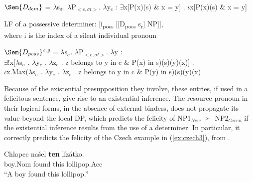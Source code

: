 \documentclass[output=paper,modfonts,nonflat]{langsci/langscibook}
\begin{document}
\ea
$\Sem{D_{dem}}$ = $\lambda$s$_{\sigma}$. $\lambda$P$_{<e,\sigma t>}$. $\lambda$y$_{e}$ : $\exists$x[P(x)(s) \& x = y] . $\iota$x[P(x)(s) \& x = y] \label{definition:demonstrative}
\z


\ea LF of a possessive determiner:
[i\textsubscript{poss} [[D\textsubscript{poss} s\textsubscript{r}] NP]],\\
where i is the index of a silent individual pronoun
\z

\ea
$\Sem{D_{poss}}$$^{c,g}$ = $\lambda$s$_{\sigma}$. $\lambda$P$_{<e,\sigma t>}$. $\lambda$y : \label{definition:possessive}\\
$\exists$!x[$\lambda$s$_{\sigma}$ . $\lambda$y$_{e}$ . $\lambda$z$_{e}$ .  z belongs to y in c \& P(x) in s)(s)(y)(x)] .\\
$\iota$x.Max($\lambda$s$_{\sigma}$ . $\lambda$y$_{e}$ . $\lambda$z$_{e}$ . z belongs to y in c \& P(y) in s)(s)(y)(x)
\z

Because of the existential presupposition they involve, these entries, if used in a felicitous sentence, give rise to an existential inference. The resource pronoun in their logical forms, in the absence of external binders, does not propagate its value beyond the local DP, which predicts the felicity of NP1$_{New}$ $\succ$ NP2$_{Given}$ if the existential inference results from the use of a determiner. In particular, it correctly predicts the felicity of the Czech example in (\ref{ex:czech3}), from \citet{Kucerova:2012}.

\ea \label{ex:czech3} 
\gll Chlapec na\v{s}el {\bfseries ten} l\'{i}z\'{a}tko.\\
boy.Nom found this lollipop.Acc\\
\glt ``A boy found this lollipop.''
\z


\end{document}
